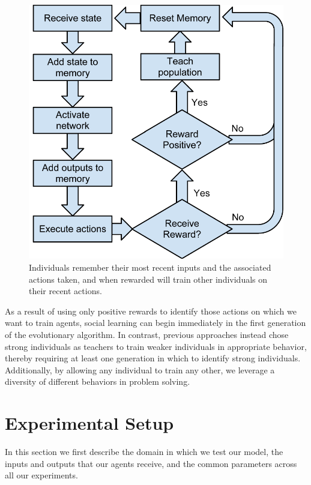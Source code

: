 \documentclass{acm_proc_article-sp}
\begin{document}
\begin{figure}
  \centering
    \includegraphics[scale=.6]{flowchart.pdf}
  \caption{Individuals remember their most recent inputs and the associated actions taken, and when rewarded will train other individuals on their recent actions.}
  \label{fig:flowchart}
\end{figure}


As a result of using only positive rewards to identify those actions on which we want to train agents, social learning can begin immediately in the first generation of the evolutionary algorithm. In contrast, previous approaches \cite{denaro1996cultural} instead chose strong individuals as teachers to train weaker individuals in appropriate behavior, thereby requiring at least one generation in which to identify strong individuals. Additionally, by allowing any individual to train any other, we leverage a diversity of different behaviors in problem solving.
 
\section{Experimental Setup}
\label{sec:setup}
In this section we first describe the domain in which we test our model, the inputs and outputs that our agents receive, and the common parameters across all our experiments.
\end{document}
